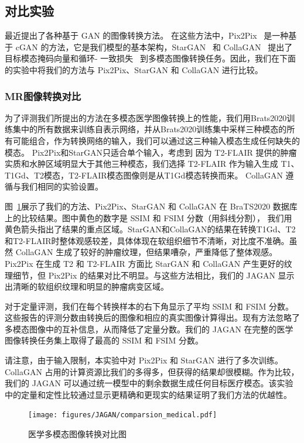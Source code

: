 \subsection{对比实验}

最近提出了各种基于 GAN 的图像转换方法。 在这些方法中，Pix2Pix~\cite{pix2pix} 是一种基于 cGAN 的方法，它是我们模型的基本架构，StarGAN~\cite{stargan} 和 CollaGAN~\cite{collagan} 提出了目标模态掩码向量和循环- 一致损失~\cite{cyclegan} 到多模态图像转换任务。因此，我们在下面的实验中将我们的方法与 Pix2Pix、StarGAN 和 CollaGAN 进行比较。

\subsubsection{MR图像转换对比}
为了评测我们所提出的方法在多模态医学图像转换上的性能，我们用Brats2020训练集中的所有数据来训练自表示网络，并从Brats2020训练集中采样三种模态的所有可能组合，作为转换网络的输入，我们可以通过这三种输入模态生成任何缺失的模态。 Pix2Pix和StarGAN只适合单个输入，考虑到 因为 T2-FLAIR 提供的肿瘤实质和水肿区域明显大于其他三种模态，我们选择 T2-FLAIR 作为输入生成 T1、T1Gd、T2模态，T2-FLAIR模态图像则是从T1Gd模态转换而来。 CollaGAN 遵循与我们相同的实验设置。

图~\ref{fig:comparsion_medical}展示了我们的方法、Pix2Pix、StarGAN 和 CollaGAN 在 BraTS2020 数据库上的比较结果。图中黄色的数字是 SSIM 和 FSIM 分数（用斜线分割）， 我们用黄色箭头指出了结果的重点区域。StarGAN和CollaGAN的结果在转换T1Gd、T2和T2-FLAIR时整体观感较差，具体体现在软组织细节不清晰，对比度不准确。虽然 CollaGAN 生成了较好的肿瘤纹理，但结果嘈杂，严重降低了整体观感。 Pix2Pix 在生成 T2 和 T2-FLAIR 方面比 StarGAN 和 CollaGAN 产生更好的纹理细节，但 Pix2Pix 的结果对比不明显。与这些方法相比，我们的 JAGAN 显示出清晰的软组织纹理和明显的肿瘤病变区域。

对于定量评测，我们在每个转换样本的右下角显示了平均 SSIM 和 FSIM 分数。这些报告的评测分数由转换后的图像和相应的真实图像计算得出。现有方法忽略了多模态图像中的互补信息，从而降低了定量分数。我们的 JAGAN 在完整的医学图像转换任务集上取得了最高的 SSIM 和 FSIM 分数。

请注意，由于输入限制，本实验中对 Pix2Pix 和 StarGAN 进行了多次训练。 CollaGAN 占用的计算资源比我们的多得多，但获得的结果却很模糊。作为比较，我们的 JAGAN 可以通过统一模型中的剩余数据生成任何目标医疗模态。该实验中的定量和定性比较通过显示更精确和更现实的结果证明了我们方法的优越性。

\begin{figure}
	\begin{center}
		\texttt{[image: figures/JAGAN/comparsion\_medical.pdf]}
	\end{center}
	\caption{医学多模态图像转换对比图}
	\label{fig:comparsion_medical}
\end{figure}


